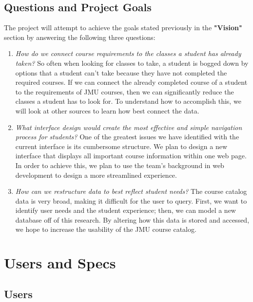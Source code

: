 \documentclass[11pt]{article}
\begin{document}
\subsection*{Questions and Project Goals}

The project will attempt to achieve the goals stated previously in the \textbf{"Vision"} section by answering the following three questions:
\begin{enumerate}
  \item \textit{How do we connect course requirements to the classes a student has already taken?} So often when looking for classes to take, a student is bogged down by options that a student can't take because they have not completed the required courses. If we can connect the already completed course of a student to the requirements of JMU courses, then we can significantly reduce the classes a student has to look for. To understand how to accomplish this, we will look at other sources to learn how best connect the data.
  \item \textit{What interface design would create the most effective and simple navigation process for students?} One of the greatest issues we have identified with the current interface is its cumbersome structure. We plan to design a new interface that displays all important course information within one web page. In order to achieve this, we plan to use the team's background in web development to design a more streamlined experience.
  \item  \textit{How can we restructure data to best reflect student needs?} The course catalog data is very broad, making it difficult for the user to query. First, we want to identify user needs and the student experience; then, we can model a new database off of this research. By altering how this data is stored and accessed, we hope to increase the usability of the JMU course catalog. 
\end{enumerate} 

\section*{Users and Specs}
\subsection*{Users}
\end{document}
